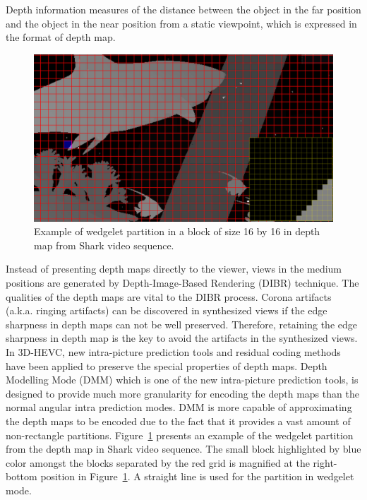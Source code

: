 Depth information measures of the distance between the object in the far position
and the object in the near position from a static viewpoint,
which is expressed in the format of depth map.
\begin{figure}[!t]
    \centering
    \includegraphics[width=\textwidth,height=\textheight,keepaspectratio]{Figures/wedgelet}
    \caption[Wedgelet partition illustration]
    {Example of wedgelet partition in a block of size 16 by 16 in depth map
    from Shark video sequence.
    }
    \label{fig:wedgelet-partition}
\end{figure}
Instead of presenting depth maps directly to the viewer, views in the medium
positions are generated by Depth-Image-Based Rendering (DIBR) technique.
The qualities of the depth maps are vital to the DIBR process.
Corona artifacts (a.k.a. ringing artifacts) can be discovered in synthesized
views if the edge sharpness in depth maps can not be well
preserved.
Therefore, retaining the edge sharpness in depth map is the key to avoid the
artifacts in the synthesized views.
In 3D-HEVC, new intra-picture prediction tools and residual coding methods
have been applied to preserve the special properties of depth maps.
Depth Modelling Mode (DMM) which is one of the new intra-picture
prediction tools, is designed to provide much more granularity for
encoding the depth maps than the normal angular intra prediction modes.
DMM is more capable of approximating the depth maps to be encoded due to
the fact that it provides a vast amount of non-rectangle partitions.
Figure~\ref{fig:wedgelet-partition} presents an example of the wedgelet
partition from the depth map in Shark video sequence.
The small block highlighted by blue color amongst the blocks
separated by the red grid is magnified at the right-bottom position in
Figure~\ref{fig:wedgelet-partition}.
A straight line is used for the partition in wedgelet mode.
